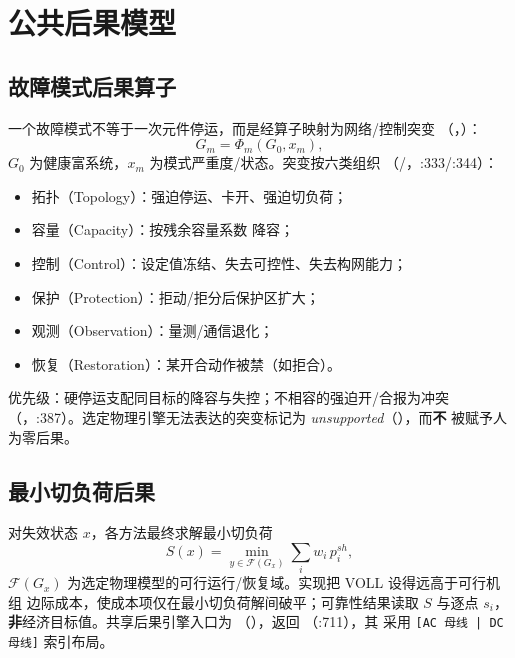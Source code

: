 \section{公共后果模型}\label{sec:rel-consequence}

\subsection{故障模式后果算子}
一个故障模式不等于一次元件停运，而是经算子映射为网络/控制突变
（，）：
\begin{equation}
G_m=\Phi_m(G_0,x_m),
\end{equation}
$G_0$ 为健康富系统，$x_m$ 为模式严重度/状态。突变按六类组织
（/，:333/:344）：
\begin{itemize}
  \item 拓扑（Topology）：强迫停运、卡开、强迫切负荷；
  \item 容量（Capacity）：按残余容量系数  降容；
  \item 控制（Control）：设定值冻结、失去可控性、失去构网能力；
  \item 保护（Protection）：拒动/拒分后保护区扩大；
  \item 观测（Observation）：量测/通信退化；
  \item 恢复（Restoration）：某开合动作被禁（如拒合）。
\end{itemize}
优先级：硬停运支配同目标的降容与失控；不相容的强迫开/合报为冲突
（，:387）。选定物理引擎无法表达的突变标记为
\emph{unsupported}（），而\textbf{不}
被赋予人为零后果。

\subsection{最小切负荷后果}
对失效状态 $x$，各方法最终求解最小切负荷
\begin{equation}
S(x)=\min_{y\in\mathcal F(G_x)}\sum_i w_i\,p_i^{sh},
\end{equation}
$\mathcal F(G_x)$ 为选定物理模型的可行运行/恢复域。实现把 VOLL 设得远高于可行机组
边际成本，使成本项仅在最小切负荷解间破平；可靠性结果读取 $S$ 与逐点 $s_i$，
\textbf{非}经济目标值。共享后果引擎入口为 
（），返回 （:711），其
 采用 \texttt{[AC 母线 | DC 母线]} 索引布局。


